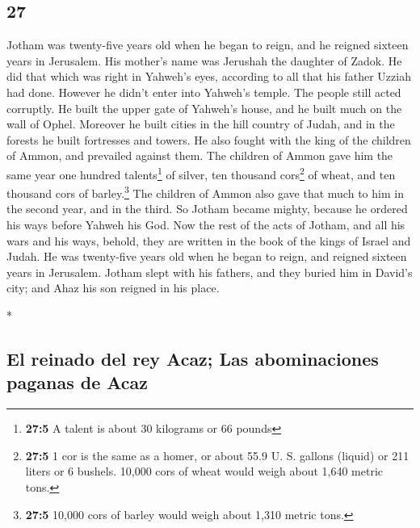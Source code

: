 \begin{paracol}{2}
\switchcolumn
\begin{otherlanguage}{english}

\hypertarget{section-53}{%
\section{27}\label{section-53}}

 Jotham was twenty-five years old when he began to reign,
and he reigned sixteen years in Jerusalem. His mother's name was
Jerushah the daughter of Zadok.  He did that which was
right in Yahweh's eyes, according to all that his father Uzziah had
done. However he didn't enter into Yahweh's temple. The people still
acted corruptly.  He built the upper gate of Yahweh's
house, and he built much on the wall of Ophel.  Moreover
he built cities in the hill country of Judah, and in the forests he
built fortresses and towers.  He also fought with the king
of the children of Ammon, and prevailed against them. The children of
Ammon gave him the same year one hundred talents\footnote{\textbf{27:5}
  A talent is about 30 kilograms or 66 pounds} of silver, ten thousand
cors\footnote{\textbf{27:5} 1 cor is the same as a homer, or about 55.9
  U. S. gallons (liquid) or 211 liters or 6 bushels. 10,000 cors of
  wheat would weigh about 1,640 metric tons.} of wheat, and ten thousand
cors of barley.\footnote{\textbf{27:5} 10,000 cors of barley would weigh
  about 1,310 metric tons.} The children of Ammon also gave that much to
him in the second year, and in the third.  So Jotham
became mighty, because he ordered his ways before Yahweh his God.
 Now the rest of the acts of Jotham, and all his wars and
his ways, behold, they are written in the book of the kings of Israel
and Judah.  He was twenty-five years old when he began to
reign, and reigned sixteen years in Jerusalem.  Jotham
slept with his fathers, and they buried him in David's city; and Ahaz
his son reigned in his place.

\end{otherlanguage}

\switchcolumn[0]*

\hypertarget{el-reinado-del-rey-acaz-las-abominaciones-paganas-de-acaz}{%
\subsection{El reinado del rey Acaz; Las abominaciones paganas de
Acaz}\label{el-reinado-del-rey-acaz-las-abominaciones-paganas-de-acaz}}


\end{paracol}
